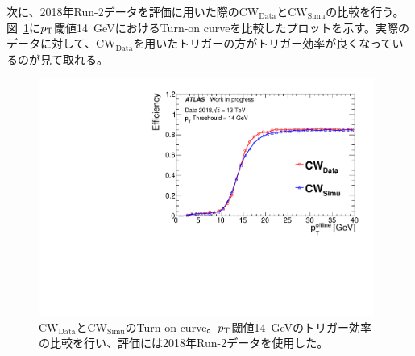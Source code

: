 次に、2018年Run-2データを評価に用いた際の$\mathrm{CW_{Data}}$と$\mathrm{CW_{Simu}}$の比較を行う。図~\ref{fig:v06v07}に$p_{\rm{T}}$閾値14~GeVにおけるTurn-on curveを比較したプロットを示す。実際のデータに対して、$\mathrm{CW_{Data}}$を用いたトリガーの方がトリガー効率が良くなっているのが見て取れる。
\begin{figure}[tb]
  \centering
  \includegraphics[clip, width=11cm]{fig/5/v06vsv07_MU14_re.pdf}
  \caption{$\mathrm{CW_{Data}}$と$\mathrm{CW_{Simu}}$のTurn-on curve。$p_{\rm{T}}$閾値14~GeVのトリガー効率の比較を行い、評価には2018年Run-2データを使用した。}
  \label{fig:v06v07}
\end{figure}

